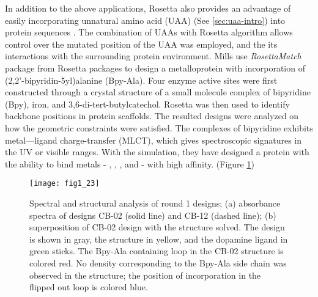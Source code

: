 \begin{refsection}
In addition to the above applications, Rosetta also provides an
advantage of easily incorporating unnatural amino acid (UAA) (See
\ref{sec:uaa-intro}) into protein sequences \cite{Renfrew2012b}. The
combination of UAAs with Rosetta algorithm allows control over the mutated
position of the UAA was employed, and the its interactions with the surrounding
protein environment\cite{Renfrew2012b}. Mills  use
\emph{RosettaMatch} package from Rosetta packages to design a metalloprotein
with incorporation of (2,2’-bipyridin-5yl)alanine (Bpy-Ala)\cite{Mills2013}.
Four enzyme active sites were first constructed through a crystal structure of
a small molecule complex of bipyridine (Bpy), iron, and
3,6-di-tert-butylcatechol. Rosetta was then used to identify backbone positions
in protein scaffolds. The resulted designs were analyzed on how the geometric
constraints were satisfied. The complexes of bipyridine exhibits metal—ligand
charge-transfer (MLCT), which gives spectroscopic signatures in the UV or
visible ranges. With the simulation, they have designed a protein with the
ability to bind metals - , , , and
 - with high affinity. (Figure \ref{fig:rosetta-uaa}) 
\begin{figure}[p] \centering \texttt{[image: fig1\_23]}
    \caption[Spectral and structural analysis of round 1 designs; (a)
        absorbance spectra of designs CB-02 (solid line) and CB-12 (dashed
        line); (b) superposition of CB-02 design with the structure solved. The
        design is shown in gray, the structure in yellow, and the dopamine
        ligand in green sticks. The Bpy-Ala containing loop in the CB-02
        structure is colored red. No density corresponding to the Bpy-Ala side
        chain was observed in the structure; the position of incorporation in
    the flipped out loop is colored blue.] {Spectral and structural analysis of
        round 1 designs; (a) absorbance spectra of designs CB-02 (solid line)
        and CB-12 (dashed line); (b) superposition of CB-02 design with the
        structure solved. The design is shown in gray, the structure in yellow,
        and the dopamine ligand in green sticks. The Bpy-Ala containing loop in
        the CB-02 structure is colored red. No density corresponding to the
        Bpy-Ala side chain was observed in the structure; the position of
        incorporation in the flipped out loop is colored blue\cite{Mills2013}.}
        \label{fig:rosetta-uaa} 
\end{figure}


\end{refsection}
